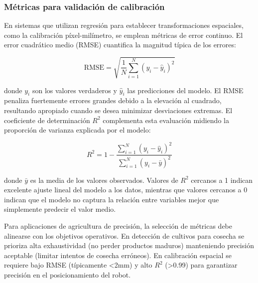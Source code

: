 \subsubsection{Métricas para validación de calibración}

En sistemas que utilizan regresión para establecer transformaciones espaciales, como la calibración píxel-milímetro, se emplean métricas de error continuo. El error cuadrático medio (RMSE) cuantifica la magnitud típica de los errores:

\begin{equation}
\text{RMSE} = \sqrt{\frac{1}{N}\sum_{i=1}^{N}(y_i - \hat{y}_i)^2}
\end{equation}

donde $y_i$ son los valores verdaderos y $\hat{y}_i$ las predicciones del modelo. El RMSE penaliza fuertemente errores grandes debido a la elevación al cuadrado, resultando apropiado cuando se desea minimizar desviaciones extremas. El coeficiente de determinación $R^2$ complementa esta evaluación midiendo la proporción de varianza explicada por el modelo:

\begin{equation}
R^2 = 1 - \frac{\sum_{i=1}^{N}(y_i - \hat{y}_i)^2}{\sum_{i=1}^{N}(y_i - \bar{y})^2}
\end{equation}

donde $\bar{y}$ es la media de los valores observados. Valores de $R^2$ cercanos a 1 indican excelente ajuste lineal del modelo a los datos, mientras que valores cercanos a 0 indican que el modelo no captura la relación entre variables mejor que simplemente predecir el valor medio.

Para aplicaciones de agricultura de precisión, la selección de métricas debe alinearse con los objetivos operativos. En detección de cultivos para cosecha se prioriza alta exhaustividad (no perder productos maduros) manteniendo precisión aceptable (limitar intentos de cosecha erróneos). En calibración espacial se requiere bajo RMSE (típicamente <2mm) y alto $R^2$ (>0.99) para garantizar precisión en el posicionamiento del robot.
